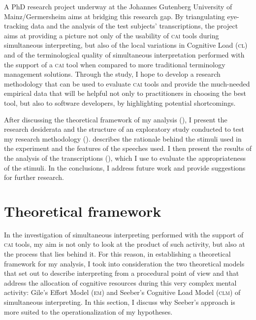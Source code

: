 \documentclass[output=paper]{langsci/langscibook}
\begin{document}
A PhD research project underway at the Johannes Gutenberg University of Mainz\slash Germersheim \citep{Prandi2016, Prandi2017a, Prandi2017b} aims at bridging this research gap. By triangulating eye-tracking data and the analysis of the test subjects’ transcriptions, the project aims at providing a picture not only of the usability of \textsc{cai} tools during simultaneous interpreting, but also of the local variations in Cognitive Load (\textsc{cl}) and of the terminological quality of simultaneous interpretation performed with the support of a \textsc{cai} tool when compared to more traditional terminology management solutions. Through the study, I hope to develop a research methodology that can be used to evaluate \textsc{cai} tools and provide the much-needed empirical data that will be helpful not only to practitioners in choosing the best tool, but also to software developers, by highlighting potential shortcomings.

After discussing the theoretical framework of my analysis (), I present the research desiderata and the structure of an exploratory study conducted to test my research methodology ().  describes the rationale behind the stimuli used in the experiment and the features of the speeches used. I then present the results of the analysis of the transcriptions (), which I use to evaluate the appropriateness of the stimuli. In the conclusions, I address future work and provide suggestions for further research.

\section{Theoretical framework}\label{sec:prandi:2}
In the investigation of simultaneous interpreting performed with the support of \textsc{cai} tools, my aim is not only to look at the product of such activity, but also at the process that lies behind it. For this reason, in establishing a theoretical framework for my analysis, I took into consideration the two theoretical models that set out to describe interpreting from a procedural point of view and that address the allocation of cognitive resources during this very complex mental activity: Gile’s Effort Model (\textsc{em}) and Seeber’s Cognitive Load Model (\textsc{clm}) of simultaneous interpreting. In this section, I discuss why Seeber’s approach is more suited to the operationalization of my hypotheses.
\end{document}
